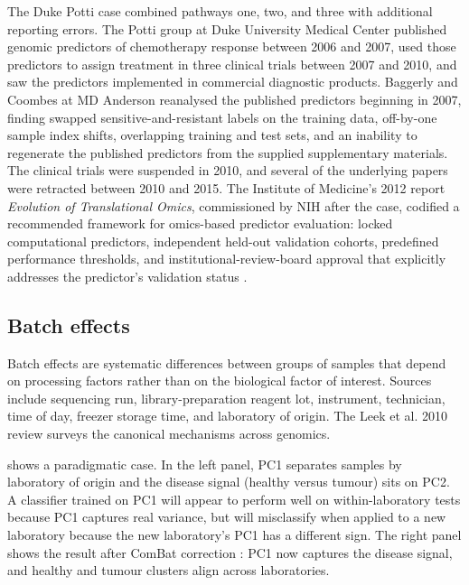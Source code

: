The Duke Potti case \cite{paper:v6c11-baggerly-coombes-2009,
paper:v6c11-iom-omics-2012} combined pathways one, two, and three with
additional reporting errors. The Potti group at Duke University Medical
Center published genomic predictors of chemotherapy response between
2006 and 2007, used those predictors to assign treatment in three
clinical trials between 2007 and 2010, and saw the predictors
implemented in commercial diagnostic products. Baggerly and Coombes at
MD Anderson reanalysed the published predictors beginning in 2007,
finding swapped sensitive-and-resistant labels on the training data,
off-by-one sample index shifts, overlapping training and test sets,
and an inability to regenerate the published predictors from the
supplied supplementary materials. The clinical trials were suspended
in 2010, and several of the underlying papers were retracted between
2010 and 2015. The Institute of Medicine's 2012
report \emph{Evolution of Translational Omics}, commissioned by NIH
after the case, codified a recommended framework for omics-based
predictor evaluation: locked computational predictors, independent
held-out validation cohorts, predefined performance thresholds, and
institutional-review-board approval that explicitly addresses the
predictor's validation status \cite[][IOM Recommendations
1--4]{paper:v6c11-iom-omics-2012}.

\subsection{Batch effects}

Batch effects are systematic differences between groups of samples
that depend on processing factors rather than on the biological factor
of interest. Sources include sequencing run, library-preparation
reagent lot, instrument, technician, time of day, freezer storage time,
and laboratory of origin. The Leek et al. 2010 review
\cite{paper:v6c11-leek-batch-2010} surveys the canonical mechanisms
across genomics.

 shows a paradigmatic case. In the
left panel, PC1 separates samples by laboratory of origin and the
disease signal (healthy versus tumour) sits on PC2. A classifier
trained on PC1 will appear to perform well on within-laboratory tests
because PC1 captures real variance, but will misclassify when applied
to a new laboratory because the new laboratory's PC1 has a different
sign. The right panel shows the result after ComBat correction
\cite{paper:v6c11-johnson-combat-2007}: PC1 now captures the disease
signal, and healthy and tumour clusters align across laboratories.

